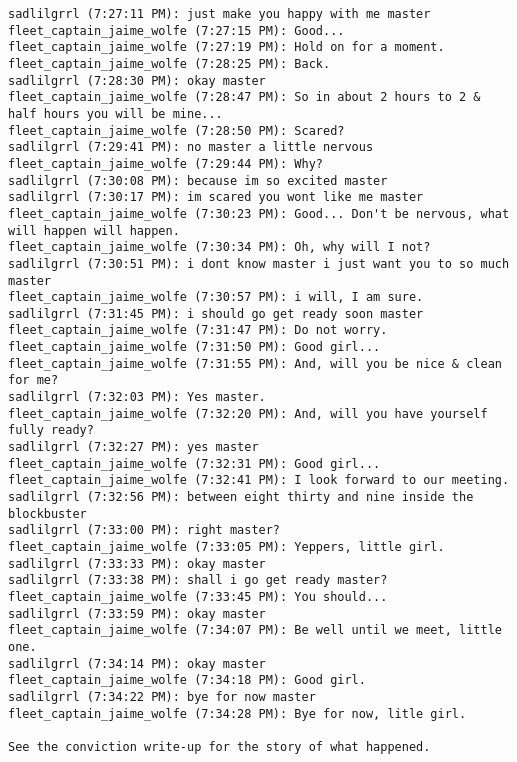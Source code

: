 \begin{verbatim}
sadlilgrrl (7:27:11 PM): just make you happy with me master
fleet_captain_jaime_wolfe (7:27:15 PM): Good...
fleet_captain_jaime_wolfe (7:27:19 PM): Hold on for a moment.
fleet_captain_jaime_wolfe (7:28:25 PM): Back.
sadlilgrrl (7:28:30 PM): okay master
fleet_captain_jaime_wolfe (7:28:47 PM): So in about 2 hours to 2 & half hours you will be mine...
fleet_captain_jaime_wolfe (7:28:50 PM): Scared?
sadlilgrrl (7:29:41 PM): no master a little nervous
fleet_captain_jaime_wolfe (7:29:44 PM): Why?
sadlilgrrl (7:30:08 PM): because im so excited master
sadlilgrrl (7:30:17 PM): im scared you wont like me master
fleet_captain_jaime_wolfe (7:30:23 PM): Good... Don't be nervous, what will happen will happen.
fleet_captain_jaime_wolfe (7:30:34 PM): Oh, why will I not?
sadlilgrrl (7:30:51 PM): i dont know master i just want you to so much master
fleet_captain_jaime_wolfe (7:30:57 PM): i will, I am sure.
sadlilgrrl (7:31:45 PM): i should go get ready soon master
fleet_captain_jaime_wolfe (7:31:47 PM): Do not worry.
fleet_captain_jaime_wolfe (7:31:50 PM): Good girl...
fleet_captain_jaime_wolfe (7:31:55 PM): And, will you be nice & clean for me?
sadlilgrrl (7:32:03 PM): Yes master.
fleet_captain_jaime_wolfe (7:32:20 PM): And, will you have yourself fully ready?
sadlilgrrl (7:32:27 PM): yes master
fleet_captain_jaime_wolfe (7:32:31 PM): Good girl...
fleet_captain_jaime_wolfe (7:32:41 PM): I look forward to our meeting.
sadlilgrrl (7:32:56 PM): between eight thirty and nine inside the blockbuster
sadlilgrrl (7:33:00 PM): right master?
fleet_captain_jaime_wolfe (7:33:05 PM): Yeppers, little girl.
sadlilgrrl (7:33:33 PM): okay master
sadlilgrrl (7:33:38 PM): shall i go get ready master?
fleet_captain_jaime_wolfe (7:33:45 PM): You should...
sadlilgrrl (7:33:59 PM): okay master
fleet_captain_jaime_wolfe (7:34:07 PM): Be well until we meet, little one.
sadlilgrrl (7:34:14 PM): okay master
fleet_captain_jaime_wolfe (7:34:18 PM): Good girl.
sadlilgrrl (7:34:22 PM): bye for now master
fleet_captain_jaime_wolfe (7:34:28 PM): Bye for now, litle girl. 

See the conviction write-up for the story of what happened.
\end{verbatim}



